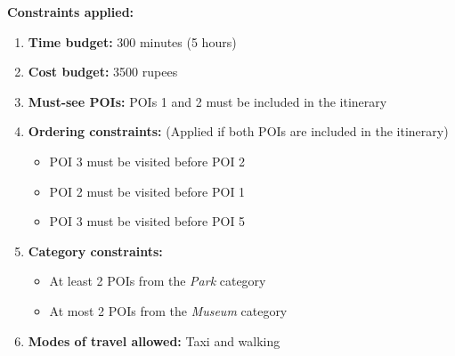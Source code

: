 \begin{table}[H]
\centering
{}
\caption{Taxi Travel Time Matrix (in minutes)}
\label{tab:taxi_time_matrix}
\end{table}


\textbf{Constraints applied:}
\begin{enumerate}[label=\textbf{\arabic*.}]
    \item \textbf{Time budget:} 300 minutes (5 hours)
    \item \textbf{Cost budget:} 3500 rupees
    \item \textbf{Must-see POIs:} POIs 1 and 2 must be included in the itinerary
    \item \textbf{Ordering constraints:} (Applied if both POIs are included in the itinerary)
    \begin{itemize}
        \item POI 3 must be visited before POI 2
        \item POI 2 must be visited before POI 1
        \item POI 3 must be visited before POI 5
    \end{itemize}
    \item \textbf{Category constraints:}
    \begin{itemize}
        \item At least 2 POIs from the \textit{Park} category
        \item At most 2 POIs from the \textit{Museum} category
    \end{itemize}
    \item \textbf{Modes of travel allowed:} Taxi and walking
\end{enumerate}

